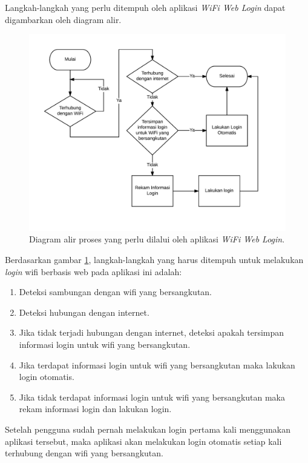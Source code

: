 Langkah-langkah yang perlu ditempuh oleh aplikasi \textit{WiFi Web Login} dapat digambarkan oleh diagram alir.

\begin{figure}[h]
    \centering
    \includegraphics[scale=0.85]{Gambar/WifiWebLogin.png}
    \caption[Diagram alir proses yang perlu dilalui oleh aplikasi \textit{WiFi Web Login}.]{Diagram alir proses yang perlu dilalui oleh aplikasi \textit{WiFi Web Login}.} 
    \label{fig:wifiweblogin}
\end{figure}

Berdasarkan gambar \ref{fig:wifiweblogin}, langkah-langkah yang harus ditempuh untuk melakukan \textit{login} wifi berbasis web pada aplikasi ini adalah:

\begin{enumerate}
    \item{Deteksi sambungan dengan wifi yang bersangkutan.}
    \item{Deteksi hubungan dengan internet.}
    \item{Jika tidak terjadi hubungan dengan internet, deteksi apakah tersimpan informasi login untuk wifi yang bersangkutan.}
    \item{Jika terdapat informasi login untuk wifi yang bersangkutan maka lakukan login otomatis.}
    \item{Jika tidak terdapat informasi login untuk wifi yang bersangkutan maka rekam informasi login dan lakukan login.}
\end{enumerate}

Setelah pengguna sudah pernah melakukan login pertama kali menggunakan aplikasi tersebut, maka aplikasi akan melakukan login otomatis setiap kali terhubung dengan wifi yang bersangkutan.
